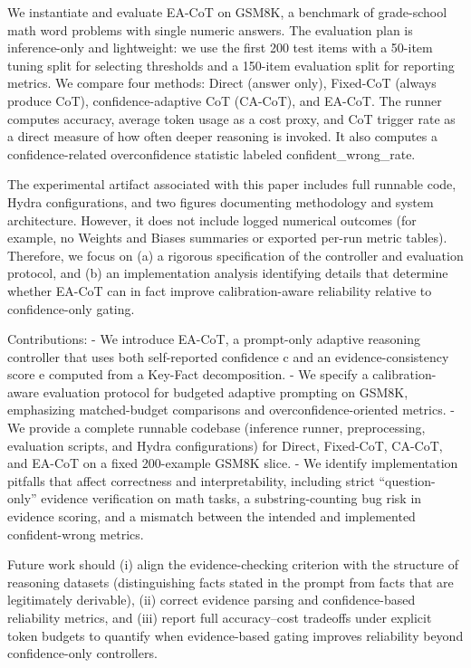 \documentclass[journal,article,submit,pdftex,moreauthors]{Definitions/mdpi}
\begin{document}
We instantiate and evaluate EA-CoT on GSM8K, a benchmark of grade-school math word problems with single numeric answers. The evaluation plan is inference-only and lightweight: we use the first 200 test items with a 50-item tuning split for selecting thresholds and a 150-item evaluation split for reporting metrics. We compare four methods: Direct (answer only), Fixed-CoT (always produce CoT), confidence-adaptive CoT (CA-CoT), and EA-CoT. The runner computes accuracy, average token usage as a cost proxy, and CoT trigger rate as a direct measure of how often deeper reasoning is invoked. It also computes a confidence-related overconfidence statistic labeled confident\_wrong\_rate.

The experimental artifact associated with this paper includes full runnable code, Hydra configurations, and two figures documenting methodology and system architecture. However, it does not include logged numerical outcomes (for example, no Weights and Biases summaries or exported per-run metric tables). Therefore, we focus on (a) a rigorous specification of the controller and evaluation protocol, and (b) an implementation analysis identifying details that determine whether EA-CoT can in fact improve calibration-aware reliability relative to confidence-only gating.

Contributions:
- We introduce EA-CoT, a prompt-only adaptive reasoning controller that uses both self-reported confidence c and an evidence-consistency score e computed from a Key-Fact decomposition.
- We specify a calibration-aware evaluation protocol for budgeted adaptive prompting on GSM8K, emphasizing matched-budget comparisons and overconfidence-oriented metrics.
- We provide a complete runnable codebase (inference runner, preprocessing, evaluation scripts, and Hydra configurations) for Direct, Fixed-CoT, CA-CoT, and EA-CoT on a fixed 200-example GSM8K slice.
- We identify implementation pitfalls that affect correctness and interpretability, including strict “question-only” evidence verification on math tasks, a substring-counting bug risk in evidence scoring, and a mismatch between the intended and implemented confident-wrong metrics.

Future work should (i) align the evidence-checking criterion with the structure of reasoning datasets (distinguishing facts stated in the prompt from facts that are legitimately derivable), (ii) correct evidence parsing and confidence-based reliability metrics, and (iii) report full accuracy–cost tradeoffs under explicit token budgets to quantify when evidence-based gating improves reliability beyond confidence-only controllers.
\end{document}
